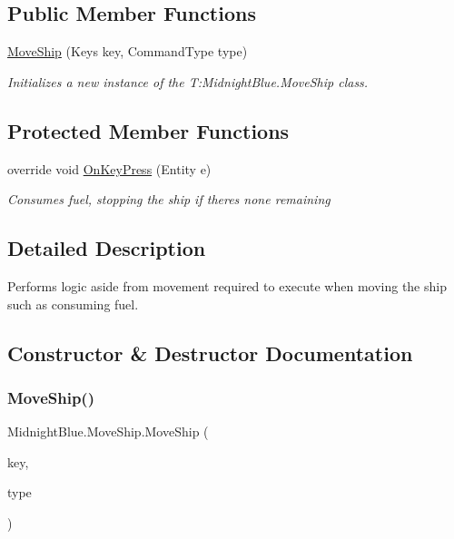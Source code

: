 \subsection*{Public Member Functions}
\begin{DoxyCompactItemize}
\item 
\hyperlink{class_midnight_blue_1_1_move_ship_a7c3de7f43d19cde694040c71a5ee5fa0}{Move\+Ship} (Keys key, Command\+Type type)
\begin{DoxyCompactList}\small\item\em Initializes a new instance of the T\+:\+Midnight\+Blue.\+Move\+Ship class. \end{DoxyCompactList}\end{DoxyCompactItemize}
\subsection*{Protected Member Functions}
\begin{DoxyCompactItemize}
\item 
override void \hyperlink{class_midnight_blue_1_1_move_ship_ac4b3dcb62954548f27bad5e5d6a00cdf}{On\+Key\+Press} (Entity e)
\begin{DoxyCompactList}\small\item\em Consumes fuel, stopping the ship if there\textquotesingle{}s none remaining \end{DoxyCompactList}\end{DoxyCompactItemize}


\subsection{Detailed Description}
Performs logic aside from movement required to execute when moving the ship such as consuming fuel. 



\subsection{Constructor \& Destructor Documentation}
\hypertarget{class_midnight_blue_1_1_move_ship_a7c3de7f43d19cde694040c71a5ee5fa0}{}\label{class_midnight_blue_1_1_move_ship_a7c3de7f43d19cde694040c71a5ee5fa0} 
\subsubsection{\texorpdfstring{Move\+Ship()}{MoveShip()}}
{\footnotesize\ttfamily Midnight\+Blue.\+Move\+Ship.\+Move\+Ship (\begin{DoxyParamCaption}\item[{Keys}]{key,  }\item[{Command\+Type}]{type }\end{DoxyParamCaption})\hspace{0.3cm}{\ttfamily [inline]}}



